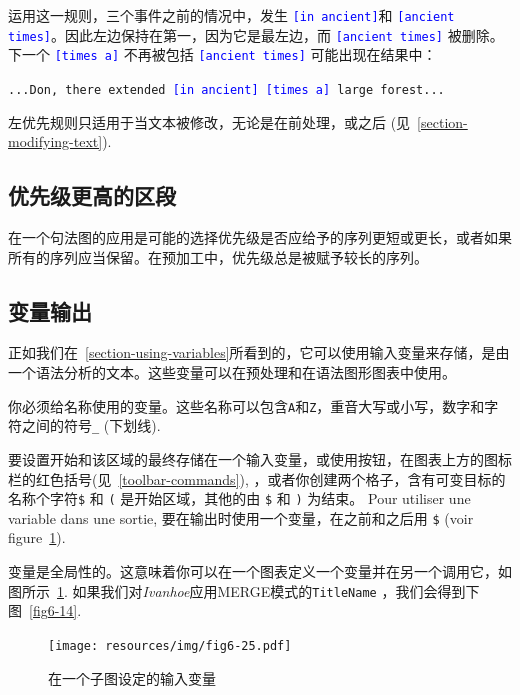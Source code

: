 \bigskip
\noindent 运用这一规则，三个事件之前的情况中，发生 \textcolor{blue}{\texttt{[in ancient]}}和
\textcolor{blue}{\texttt{[ancient times]}}。因此左边保持在第一，因为它是最左边，而 \textcolor{blue}{\texttt{[ancient times]}} 被删除。下一个  \textcolor{blue}{\texttt{[times a]}} 不再被包括
\textcolor{blue}{\texttt{[ancient times]}} 可能出现在结果中：

\begin{center}
\texttt{...Don, there extended \textcolor{blue}{[in ancient] [times a]} large forest...}
\end{center}

\noindent 左优先规则只适用于当文本被修改，无论是在前处理，或之后 (见~\ref{section-modifying-text}).

\subsection{优先级更高的区段}
在一个句法图的应用是可能的选择优先级是否应给予的序列更短或更长，或者如果所有的序列应当保留。在预加工中，优先级总是被赋予较长的序列。


\subsection{变量输出}
\label{section-variables}
正如我们在~\ref{section-using-variables}所看到的，它可以使用输入变量来存储，是由一个语法分析的文本。这些变量可以在预处理和在语法图形图表中使用。


\bigskip
\noindent 你必须给名称使用的变量。这些名称可以包含\verb+A+和\verb+Z+，重音大写或小写，数字和字符之间的符号\verb+_+ (下划线).

\bigskip
\noindent 要设置开始和该区域的最终存储在一个输入变量，或使用按钮，在图表上方的图标栏的红色括号(见~\ref{toolbar-commands}),
，或者你创建两个格子，含有可变目标的名称个字符\verb-$- 和 \verb-(- 是开始区域，其他的由 \verb-$- 和 \verb-)- 为结束。
Pour utiliser une variable dans une sortie, 要在输出时使用一个变量，在之前和之后用 \verb-$-
 (voir figure~\ref{fig-variable-definition}).

\bigskip
\noindent 变量是全局性的。这意味着你可以在一个图表定义一个变量并在另一个调用它，如图所示~\ref{fig-variable-definition}. 如果我们对\textit{Ivanhoe}应用MERGE模式的\verb+TitleName+
，我们会得到下图~\ref{fig6-14}.

\begin{figure}[!p]
\begin{center}
\texttt{[image: resources/img/fig6-25.pdf]}
\caption{在一个子图设定的输入变量\label{fig-variable-definition}}
\end{center}
\end{figure}

